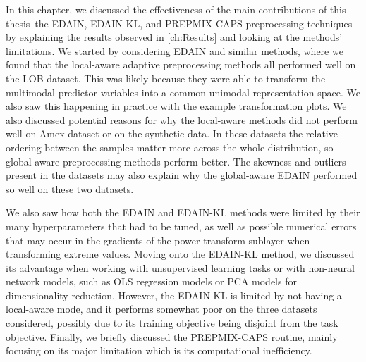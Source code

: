 \documentclass{statsmsc}
\begin{document}
{In this chapter, we discussed the effectiveness of the main contributions of
this thesis--the \ac{EDAIN}, \ac{EDAIN-KL}, and \ac{PREPMIX-CAPS}
preprocessing techniques--by explaining the results observed in
\cref{ch:Results} and looking at the methods' limitations.
We started by
considering \ac{EDAIN} and similar methods, where we found that the local-aware
adaptive preprocessing methods all performed well on the \ac{LOB} dataset. This
was likely because they were able to transform the multimodal predictor
variables into a common unimodal representation space. We also saw this happening
in practice with the example transformation plots.
We also discussed potential reasons for why the local-aware methods did not perform well on Amex
dataset or on the synthetic data. In these datasets the relative ordering between the samples
matter more across the whole distribution, so global-aware
preprocessing methods perform better.  The skewness and outliers present in the
datasets may also explain why the global-aware \ac{EDAIN} performed so well on
these two datasets.

We also saw how both the \ac{EDAIN} and \ac{EDAIN-KL} methods
were limited by their many hyperparameters that had to be tuned, as well as
possible numerical errors that may occur in the gradients of the power transform sublayer when
transforming extreme values.  Moving onto the \ac{EDAIN-KL} method, we discussed
its advantage when working with unsupervised learning tasks or with non-neural
network models, such as \ac{OLS} regression models or \ac{PCA} models for
dimensionality reduction. However, the \ac{EDAIN-KL} is limited by not having a
local-aware mode, and it performs somewhat poor on the three datasets
considered, possibly due to its training objective being disjoint from the task
objective.
Finally, we briefly discussed the \ac{PREPMIX-CAPS} routine, mainly
focusing on its major limitation which is its computational inefficiency.




}
\end{document}
